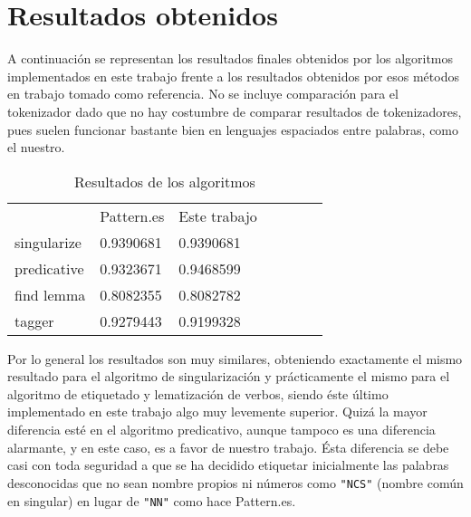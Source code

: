 \section{Resultados obtenidos}
A continuación se representan los resultados finales obtenidos por los algoritmos implementados en este trabajo frente a los resultados obtenidos por esos métodos en trabajo tomado como referencia. No se incluye comparación para el tokenizador dado que no hay costumbre de comparar resultados de tokenizadores, pues suelen funcionar bastante bien en lenguajes espaciados entre palabras, como el nuestro. 
\begin{table}[H]
\centering
\caption*{Resultados de los algoritmos}
\label{my-label}
\begin{tabular}{l|l|l|llll}
\cline{2-3}
                       &    \textsf{Pattern.es}               &   \textsf{Este trabajo}                &  \\ \cline{1-3}
\multicolumn{1}{|l|}{singularize} & 0.9390681  & 0.9390681     &   \\ \cline{1-1}
\multicolumn{1}{|l|}{predicative} & 0.9323671  & 0.9468599     &    \\ \cline{1-1}
\multicolumn{1}{|l|}{find lemma}  & 0.8082355  & 0.8082782     &   \\ \cline{1-1}
\multicolumn{1}{|l|}{tagger}      & 0.9279443  & 0.9199328    &   \\ \cline{1-3}
\end{tabular}
\end{table}

Por lo general los resultados son muy similares, obteniendo exactamente el mismo resultado para el algoritmo de singularización y prácticamente el mismo para el algoritmo de etiquetado y lematización de verbos, siendo éste último implementado en este trabajo algo muy levemente superior. \newline
Quizá la mayor diferencia esté en el algoritmo predicativo, aunque tampoco es una diferencia alarmante, y en este caso, es a favor de nuestro trabajo. Ésta diferencia se debe casi con toda seguridad a que se ha decidido etiquetar inicialmente las palabras desconocidas que no sean nombre propios ni números como \texttt{"NCS"} (nombre común en singular) en lugar de \texttt{"NN"} como hace \textsf{Pattern.es}.     
